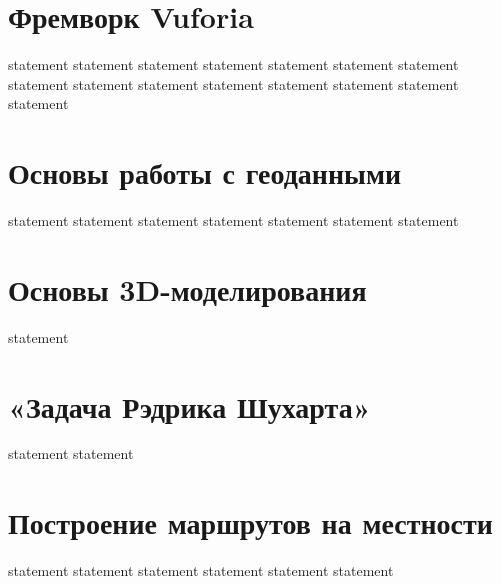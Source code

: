\section{Фремворк Vuforia}

{statement}
{statement}
{statement}
{statement}
{statement}
{statement}
{statement}
{statement}
{statement}
{statement}
{statement}
{statement}
{statement}
{statement}
{statement}

\section{Основы работы с геоданными}

{statement}
{statement}
{statement}
{statement}
{statement}
{statement}
{statement}

\section{Основы 3D-моделирования}

{statement}

\section{«Задача Рэдрика Шухарта»}

{statement}
{statement}

\section{Построение маршрутов на местности}

{statement}
{statement}
{statement}
{statement}
{statement}
{statement}